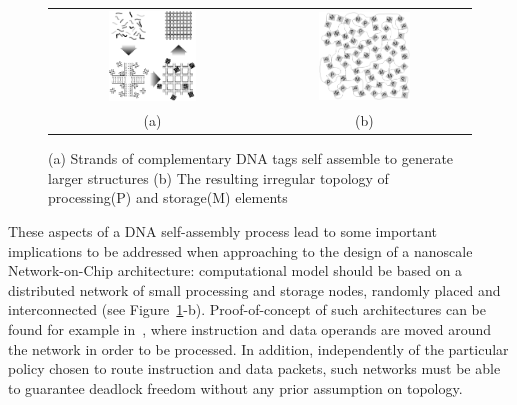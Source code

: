 \begin{figure}
\centering
\begin{tabular}{cc}
    \includegraphics[width=0.45\textwidth]{pictures/dna2b.eps} &
    \includegraphics[width=0.45\textwidth]{pictures/dna1_complex2.eps} \\
 (a) & (b)
 \end{tabular}
  \caption{(a) Strands of complementary DNA tags self assemble to
  generate larger structures (b) The resulting irregular topology of
  processing(P) and storage(M) elements }
  \label{fig:nana}
\end{figure}
These aspects of a DNA self-assembly process lead to some important
implications to be addressed when approaching to the design of
a nanoscale Network-on-Chip architecture: computational model should be based on a
distributed network of small processing and storage nodes, randomly
placed and interconnected (see Figure~\ref{fig:nana}-b).
Proof-of-concept of such architectures can be found for
example in~\cite{patwardhan2006_1}, where instruction and data
operands are moved around the network in order to be processed.
In addition, independently of the particular policy chosen to route instruction and
data packets, such networks must be able to guarantee deadlock freedom without any
prior assumption on topology.

